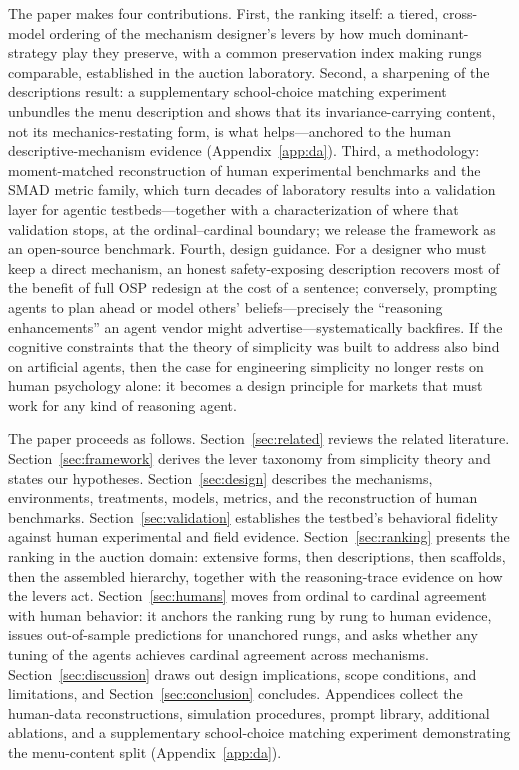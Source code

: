 The paper makes four contributions. First, the ranking itself: a tiered, cross-model ordering of the mechanism designer's levers by how much dominant-strategy play they preserve, with a common preservation index making rungs comparable, established in the auction laboratory. Second, a sharpening of the descriptions result: a supplementary school-choice matching experiment unbundles the menu description and shows that its invariance-carrying content, not its mechanics-restating form, is what helps---anchored to the human descriptive-mechanism evidence (Appendix~\ref{app:da}). Third, a methodology: moment-matched reconstruction of human experimental benchmarks and the SMAD metric family, which turn decades of laboratory results into a validation layer for agentic testbeds---together with a characterization of where that validation stops, at the ordinal--cardinal boundary\ifanon\else; we release the framework as an open-source benchmark\fi. Fourth, design guidance. For a designer who must keep a direct mechanism, an honest safety-exposing description recovers most of the benefit of full OSP redesign at the cost of a sentence; conversely, prompting agents to plan ahead or model others' beliefs---precisely the ``reasoning enhancements'' an agent vendor might advertise---systematically backfires. If the cognitive constraints that the theory of simplicity was built to address also bind on artificial agents, then the case for engineering simplicity no longer rests on human psychology alone: it becomes a design principle for markets that must work for any kind of reasoning agent.

The paper proceeds as follows. Section~\ref{sec:related} reviews the related literature. Section~\ref{sec:framework} derives the lever taxonomy from simplicity theory and states our hypotheses. Section~\ref{sec:design} describes the mechanisms, environments, treatments, models, metrics, and the reconstruction of human benchmarks. Section~\ref{sec:validation} establishes the testbed's behavioral fidelity against human experimental and field evidence. Section~\ref{sec:ranking} presents the ranking in the auction domain: extensive forms, then descriptions, then scaffolds, then the assembled hierarchy, together with the reasoning-trace evidence on how the levers act. Section~\ref{sec:humans} moves from ordinal to cardinal agreement with human behavior: it anchors the ranking rung by rung to human evidence, issues out-of-sample predictions for unanchored rungs, and asks whether any tuning of the agents achieves cardinal agreement across mechanisms. Section~\ref{sec:discussion} draws out design implications, scope conditions, and limitations, and Section~\ref{sec:conclusion} concludes. Appendices collect the human-data reconstructions, simulation procedures, prompt library, additional ablations, and a supplementary school-choice matching experiment demonstrating the menu-content split (Appendix~\ref{app:da}).
